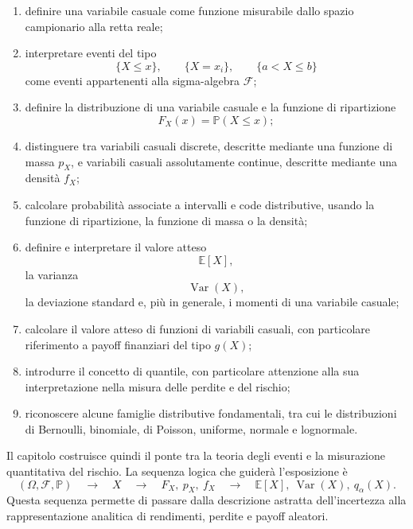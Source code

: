 \begin{enumerate}
\item definire una variabile casuale come funzione misurabile dallo spazio
campionario alla retta reale;

\item interpretare eventi del tipo
\[
\{X\leq x\},\qquad\{X=x_{i}\},\qquad\{a<X\leq b\}
\]
come eventi appartenenti alla sigma-algebra $\mathcal{F}$;

\item definire la distribuzione di una variabile casuale e la funzione di
ripartizione
\[
F_{X}(x)=\mathbb{P}(X\leq x);
\]


\item distinguere tra variabili casuali discrete, descritte mediante una
funzione di massa $p_{X}$, e variabili casuali assolutamente continue,
descritte mediante una densit\`{a} $f_{X}$;

\item calcolare probabilit\`{a} associate a intervalli e code distributive,
usando la funzione di ripartizione, la funzione di massa o la densit\`{a};

\item definire e interpretare il valore atteso
\[
\mathbb{E}[X],
\]
la varianza
\[
\operatorname{Var}(X),
\]
la deviazione standard e, pi\`{u} in generale, i momenti di una variabile casuale;

\item calcolare il valore atteso di funzioni di variabili casuali, con
particolare riferimento a payoff finanziari del tipo $g(X)$;

\item introdurre il concetto di quantile, con particolare attenzione alla sua
interpretazione nella misura delle perdite e del rischio;

\item riconoscere alcune famiglie distributive fondamentali, tra cui le
distribuzioni di Bernoulli, binomiale, di Poisson, uniforme, normale e lognormale.
\end{enumerate}

Il capitolo costruisce quindi il ponte tra la teoria degli eventi e la
misurazione quantitativa del rischio. La sequenza logica che guider\`{a}
l'esposizione \`{e}
\[
(\Omega,\mathcal{F},\mathbb{P}) \quad\longrightarrow\quad X \quad
\longrightarrow\quad F_{X},\ p_{X},\ f_{X} \quad\longrightarrow\quad
\mathbb{E}[X],\ \operatorname{Var}(X),\ q_{\alpha}(X).
\]
Questa sequenza permette di passare dalla descrizione astratta dell'incertezza
alla rappresentazione analitica di rendimenti, perdite e payoff aleatori.

